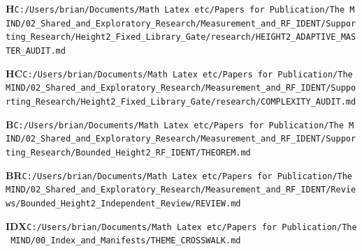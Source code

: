 \documentclass[10pt,letterpaper]{article}
\begin{document}
\noindent\textbf{H}\quad \texttt{C:/\allowbreak{}Users/\allowbreak{}brian/\allowbreak{}Documents/\allowbreak{}Math\ Latex\ etc/\allowbreak{}Papers\ for\ Publication/\allowbreak{}The\ MIND/\allowbreak{}02\_\allowbreak{}Shared\_\allowbreak{}and\_\allowbreak{}Exploratory\_\allowbreak{}Research/\allowbreak{}Measurement\_\allowbreak{}and\_\allowbreak{}RF\_\allowbreak{}IDENT/\allowbreak{}Supporting\_\allowbreak{}Research/\allowbreak{}Height2\_\allowbreak{}Fixed\_\allowbreak{}Library\_\allowbreak{}Gate/\allowbreak{}research/\allowbreak{}HEIGHT2\_\allowbreak{}ADAPTIVE\_\allowbreak{}MASTER\_\allowbreak{}AUDIT.md}\par
\noindent\textbf{HC}\quad \texttt{C:/\allowbreak{}Users/\allowbreak{}brian/\allowbreak{}Documents/\allowbreak{}Math\ Latex\ etc/\allowbreak{}Papers\ for\ Publication/\allowbreak{}The\ MIND/\allowbreak{}02\_\allowbreak{}Shared\_\allowbreak{}and\_\allowbreak{}Exploratory\_\allowbreak{}Research/\allowbreak{}Measurement\_\allowbreak{}and\_\allowbreak{}RF\_\allowbreak{}IDENT/\allowbreak{}Supporting\_\allowbreak{}Research/\allowbreak{}Height2\_\allowbreak{}Fixed\_\allowbreak{}Library\_\allowbreak{}Gate/\allowbreak{}research/\allowbreak{}COMPLEXITY\_\allowbreak{}AUDIT.md}\par
\noindent\textbf{B}\quad \texttt{C:/\allowbreak{}Users/\allowbreak{}brian/\allowbreak{}Documents/\allowbreak{}Math\ Latex\ etc/\allowbreak{}Papers\ for\ Publication/\allowbreak{}The\ MIND/\allowbreak{}02\_\allowbreak{}Shared\_\allowbreak{}and\_\allowbreak{}Exploratory\_\allowbreak{}Research/\allowbreak{}Measurement\_\allowbreak{}and\_\allowbreak{}RF\_\allowbreak{}IDENT/\allowbreak{}Supporting\_\allowbreak{}Research/\allowbreak{}Bounded\_\allowbreak{}Height2\_\allowbreak{}RF\_\allowbreak{}IDENT/\allowbreak{}THEOREM.md}\par
\noindent\textbf{BR}\quad \texttt{C:/\allowbreak{}Users/\allowbreak{}brian/\allowbreak{}Documents/\allowbreak{}Math\ Latex\ etc/\allowbreak{}Papers\ for\ Publication/\allowbreak{}The\ MIND/\allowbreak{}02\_\allowbreak{}Shared\_\allowbreak{}and\_\allowbreak{}Exploratory\_\allowbreak{}Research/\allowbreak{}Measurement\_\allowbreak{}and\_\allowbreak{}RF\_\allowbreak{}IDENT/\allowbreak{}Reviews/\allowbreak{}Bounded\_\allowbreak{}Height2\_\allowbreak{}Independent\_\allowbreak{}Review/\allowbreak{}REVIEW.md}\par
\noindent\textbf{IDX}\quad \texttt{C:/\allowbreak{}Users/\allowbreak{}brian/\allowbreak{}Documents/\allowbreak{}Math\ Latex\ etc/\allowbreak{}Papers\ for\ Publication/\allowbreak{}The\ MIND/\allowbreak{}00\_\allowbreak{}Index\_\allowbreak{}and\_\allowbreak{}Manifests/\allowbreak{}THEME\_\allowbreak{}CROSSWALK.md}\par
\end{document}
